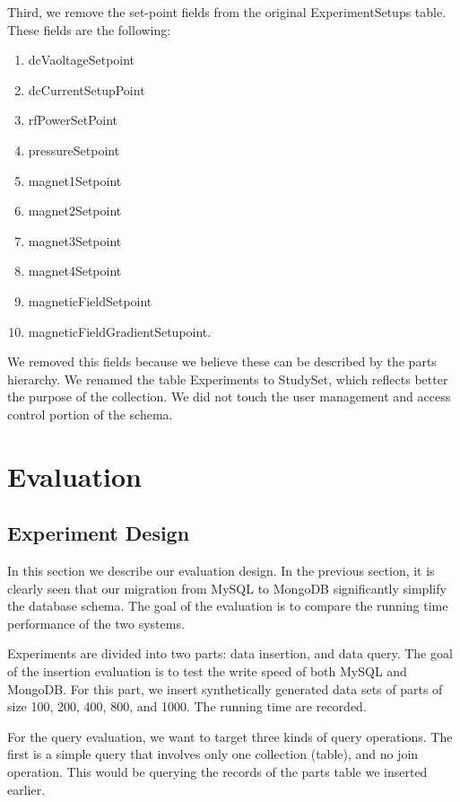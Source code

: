 Third, we remove the set-point fields from the original ExperimentSetups table. These fields are the following:

\begin{enumerate}
\item dcVaoltageSetpoint
\item dcCurrentSetupPoint
\item rfPowerSetPoint
\item pressureSetpoint
\item magnet1Setpoint
\item magnet2Setpoint
\item magnet3Setpoint
\item magnet4Setpoint
\item magneticFieldSetpoint
\item magneticFieldGradientSetupoint.
\end{enumerate}

We removed this fields because we believe these can be described by the parts hierarchy. We renamed the table Experiments to StudySet, which reflects better the purpose of the collection. We did not touch the user management and access control portion of the schema.

\section{Evaluation}

\subsection{Experiment Design}

In this section we describe our evaluation design. In the previous section, it is clearly seen that our migration from MySQL to MongoDB significantly simplify the database schema. The goal of the evaluation is to compare the running time performance of the two systems.

Experiments are divided into two parts: data insertion, and data query. The goal of the insertion evaluation is to test the write speed of both MySQL and MongoDB. For this part, we insert synthetically generated data sets of parts of size 100, 200, 400, 800, and 1000. The running time are recorded.

For the query evaluation, we want to target three kinds of query operations. The first is a simple query that involves only one collection (table), and no join operation. This would be querying the records of the parts table we inserted earlier.

